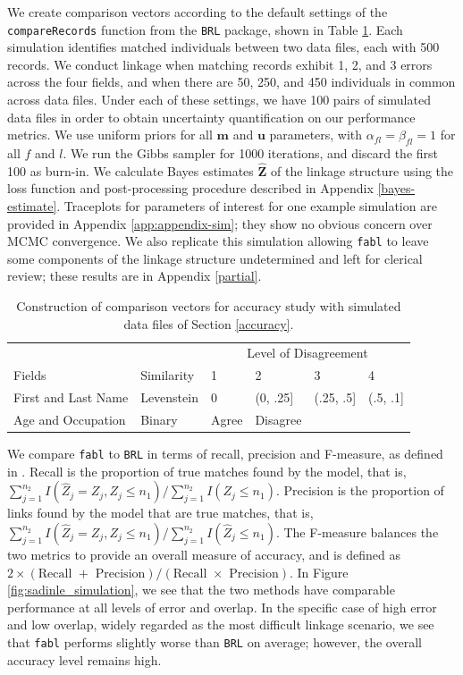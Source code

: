 \documentclass[ba]{imsart}
\begin{document}
	We create comparison vectors according to the default settings of the \texttt{compareRecords} function from the \texttt{BRL} package, shown in Table \ref{Tab:sadinle_simulation_cutoffs}. Each simulation identifies matched individuals between two data files, each with 500 records. We conduct linkage when matching records exhibit 1, 2, and 3 errors across the four fields, and when there are 50, 250, and 450 individuals in common across data files. Under each of these settings, we have 100 pairs of simulated data files in order to obtain uncertainty quantification on our performance metrics. We use uniform priors for all $\bm{m}$ and $\bm{u}$ parameters, with $\alpha_{fl} = \beta_{fl} = 1$ for all $f$ and $l$. We run the Gibbs sampler for 1000 iterations, and discard the first 100 as burn-in. We calculate Bayes estimates $\hat{\bm{Z}}$ of the linkage structure using the  loss function and post-processing procedure described in Appendix \ref{bayes-estimate}. Traceplots for parameters of interest for one example simulation are provided in Appendix \ref{app:appendix-sim}; they show no obvious concern over MCMC convergence. We also replicate this simulation allowing \texttt{fabl} to leave some components of the linkage structure undetermined and left for clerical review; these results are in Appendix \ref{partial}.
	
	\begin{table}[t]
		\centering
		\begin{tabular}[t]{llllll}
			
			\multicolumn{2}{c}{ } & \multicolumn{4}{c}{Level of Disagreement} \\
			\cline{3-6}
			Fields & Similarity & 1 & 2 & 3 & 4\\
			\hline
			First and Last Name & Levenstein & 0 & (0, .25] & (.25, .5] & (.5, .1]\\
			Age and Occupation & Binary & Agree & Disagree &  & \\
			\hline
		\end{tabular}
		\caption{Construction of comparison vectors for accuracy study with simulated data files of Section \ref{accuracy}.}
		\label{Tab:sadinle_simulation_cutoffs}
	\end{table}
	
	We compare \texttt{fabl} to \texttt{BRL} in terms of recall, precision and F-measure, as defined in \cite{christen_2012}. Recall is the proportion of true matches found by the model, that is, $\sum_{j=1}^{n_2} I(\hat{Z}_j = Z_j, Z_j \leq n_1) / \sum_{j=1}^{n_2} I(Z_j \leq n_1)$. Precision is the proportion of links found by the model that are true matches, that is, $\sum_{j=1}^{n_2} I(\hat{Z}_j = Z_j, Z_j \leq n_1) / \sum_{j=1}^{n_2} I(\hat{Z}_j \leq n_1)$. The F-measure balances the two metrics to provide an overall measure of accuracy, and is defined as $2 \times (\text{Recall } + \text{ Precision}) / (\text{Recall } \times \text{ Precision})$. In Figure \ref{fig:sadinle_simulation}, we see that the two methods have comparable performance at all levels of error and overlap. In the specific case of high error and low overlap, widely regarded as the most difficult linkage scenario, we see that \texttt{fabl} performs slightly worse than \texttt{BRL} on average; however, the overall accuracy level remains high. 
	
\end{document}
